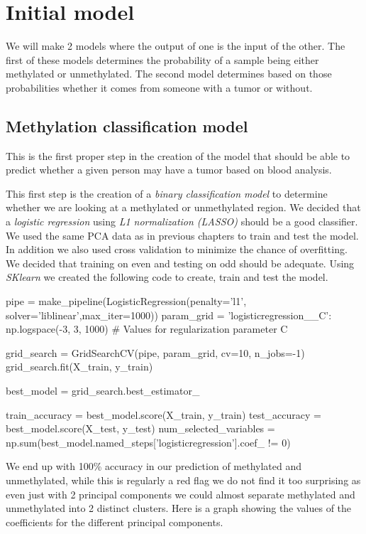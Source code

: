 \chapter{Initial model}
We will make 2 models where the output of one is the input of the other. The first of these models determines the probability of a sample being either methylated or unmethylated. The second model determines based on those probabilities whether it comes from someone with a tumor or without. 
\section{Methylation  classification model}
This is the first proper step in the creation of the model that should be able to predict whether a given person may have a tumor based on blood analysis.

This first step is the creation of a \textit{binary classification model} to determine whether we are looking at a methylated or unmethylated region. We decided that a \textit{logistic regression} using \textit{L1 normalization (LASSO)} should be a good classifier. We used the same PCA data as in previous chapters to train and test the model. In addition we also used cross validation to minimize the chance of overfitting. We decided that training on even and testing on odd should be adequate. Using \textit{SKlearn} we created the following code to create, train and test the model.
\begin{python}
pipe = make_pipeline(LogisticRegression(penalty='l1', solver='liblinear',max_iter=1000))
    param_grid = {
        'logisticregression__C': np.logspace(-3, 3, 1000)  # Values for regularization parameter C
    }

    grid_search = GridSearchCV(pipe, param_grid, cv=10, n_jobs=-1)
    grid_search.fit(X_train, y_train)



    best_model = grid_search.best_estimator_

    train_accuracy = best_model.score(X_train, y_train)
    test_accuracy = best_model.score(X_test, y_test)
    num_selected_variables = np.sum(best_model.named_steps['logisticregression'].coef_ != 0)
\end{python}
We end up with 100\% accuracy in our prediction of methylated and unmethylated, while this is regularly a red flag we do not find it too surprising as even just with 2 principal components we could almost separate methylated and unmethylated into 2 distinct clusters. Here is a graph showing the values of the coefficients for the different principal components.

